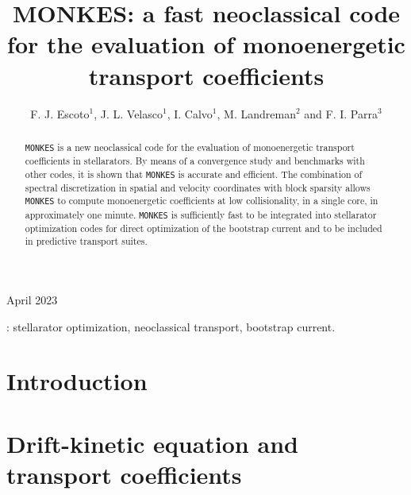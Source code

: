 \documentclass[10pt]{iopart}
\newcommand{\MONKES}{{\texttt{MONKES}}}
\begin{document}
\title[MONKES: a fast neoclassical code for the evaluation of monoenergetic transport coefficients]{MONKES: a fast neoclassical code for the evaluation of monoenergetic transport coefficients}

\author{F. J. Escoto$^1$, J. L. Velasco$^1$, I. Calvo$^1$, M. Landreman$^2$ and F. I. Parra$^3$}
\address{$^1$Laboratorio Nacional de Fusión, CIEMAT, 28040 Madrid, Spain}
\address{$^2$University of Maryland, College Park, MD 20742, USA}
\address{$^3$Princeton Plasma Physics Laboratory, Princeton, NJ 08540, USA}
\vspace{10pt}
\begin{indented}
\item[]April 2023
\end{indented}

\begin{abstract}
	{\MONKES} is a new neoclassical code for the evaluation of monoenergetic transport coefficients in stellarators. By means of a convergence study and benchmarks with other codes, it is shown that {\MONKES} is accurate and efficient. The combination of spectral discretization in spatial and velocity coordinates with block sparsity allows {\MONKES} to compute monoenergetic coefficients at low collisionality, in a single core, in approximately one minute. {\MONKES} is sufficiently fast to be integrated into stellarator optimization codes for direct optimization of the bootstrap current and to be included in predictive transport suites.    
\end{abstract}

%
\vspace{2pc}
: stellarator optimization, neoclassical transport,  bootstrap current.
%
\submitto{\NF}
%
% 
\ioptwocol
%

\section{Introduction}
\label{sec:Introduction}


\section{Drift-kinetic equation and transport coefficients}
\label{sec:DKE}

\end{document}
